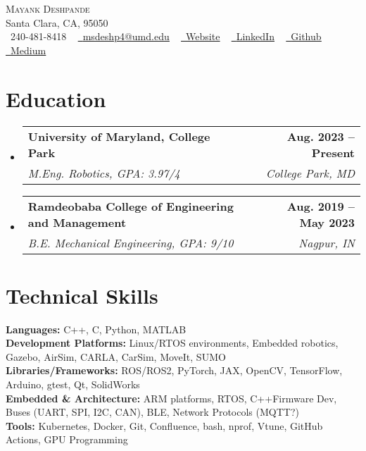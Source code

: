 \documentclass[letterpaper,10pt]{article}
\makeatletter
\newcommand{\resumeSubheading}[4]{
  \vspace{-2pt}\item
    \begin{tabular*}{1.0\textwidth}[t]{l@{\extracolsep{\fill}}r}
      \textbf{#1} & \textbf{\small #2} \\
      \textit{\small#3} & \textit{\small #4} \\
    \end{tabular*}\vspace{-7pt}
}
\newcommand{\resumeSubHeadingListStart}{\begin{itemize}[leftmargin=0.0in, label={}]}
\newcommand{\resumeSubHeadingListEnd}{\end{itemize}}
\makeatother
\begin{document}
\begin{center}
    {\Huge \scshape Mayank Deshpande} \\ \vspace{1pt}
    Santa Clara, CA, 95050 \\ \vspace{1pt}
    \small \raisebox{-0.1\height}\faPhone\ 240-481-8418 ~ \href{mailto:x@gmail.com}{\raisebox{-0.2\height}\faEnvelope\  \underline{msdeshp4@umd.edu}} ~ 
    \href{https://mayankd.me/}{\raisebox{-0.2\height}\faLink\ \underline{Website}}  ~
    \href{https://www.linkedin.com/in/msdeshpande04/}{\raisebox{-0.2\height}\faLinkedin\ \underline{LinkedIn}}  ~
    \href{https://github.com/MayankD409}{\raisebox{-0.2\height}\faGithub\ \underline{Github}} ~
    \href{https://medium.com/@deshpandemayank5}{\raisebox{-0.2\height}\faMedium\ \underline{Medium}}
    \vspace{-8pt}
\end{center}


\section{Education}
  \resumeSubHeadingListStart
    \resumeSubheading
      {University of Maryland, College Park}{Aug. 2023 -- Present}
      {M.Eng. Robotics, GPA: 3.97/4}{College Park, MD}
    \resumeSubheading
      {Ramdeobaba College of Engineering and Management}{Aug. 2019 -- May 2023}
      {B.E. Mechanical Engineering, GPA: 9/10}{Nagpur, IN}
  \resumeSubHeadingListEnd

\section{Technical Skills}
 \begin{itemize}[leftmargin=0.15in, label={}]
    \small{\item{
     \textbf{Languages:}{ C++, C, Python, MATLAB} \\
     \textbf{Development Platforms:} {Linux/RTOS environments, Embedded robotics, Gazebo, AirSim, CARLA, CarSim, MoveIt, SUMO} \\
     \textbf{Libraries/Frameworks:} {ROS/ROS2, PyTorch, JAX, OpenCV, TensorFlow, Arduino, gtest, Qt, SolidWorks} \\
     \textbf{Embedded \& Architecture:} {ARM platforms, RTOS, C++\/Firmware Dev, Buses (UART, SPI, I2C, CAN), BLE, Network Protocols (MQTT?)} \\
     \textbf{Tools:} {Kubernetes, Docker, Git, Confluence, bash, nprof, Vtune, GitHub Actions, GPU Programming} \\
    }}
 \end{itemize}
 \vspace{-13pt}
\end{document}
